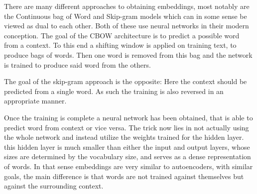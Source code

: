\documentclass[runningheads]{template/llncs}
\begin{document}
There are many different approaches to obtaining embeddings, most notably are the Continuous bag of Word and Skip-gram models which can in some sense be viewed as dual to each other.
Both of these use neural networks in their modern conception.
The goal of the CBOW architecture is to predict a possible word from a context.
To this end a shifting window is applied on training text, to produce bags of words.
Then one word is removed from this bag and the network is trained to produce said word from the others.

The goal of the skip-gram approach is the opposite: Here the context should be predicted from a single word.
As such the training is also reversed in an appropriate manner.

Once the training is complete a neural network has been obtained, that is able to predict word from context or vice versa.
The trick now lies in not actually using the whole network and instead utilize the weights trained for the hidden layer.
this hidden layer is much smaller than either the input and output layers, whose sizes are determined by the vocabulary size, and serves as a dense representation of words.
In that sense embeddings are very similar to autoencoders, with similar goals, the main difference is that words are not trained against themselves but against the surrounding context.
\end{document}
